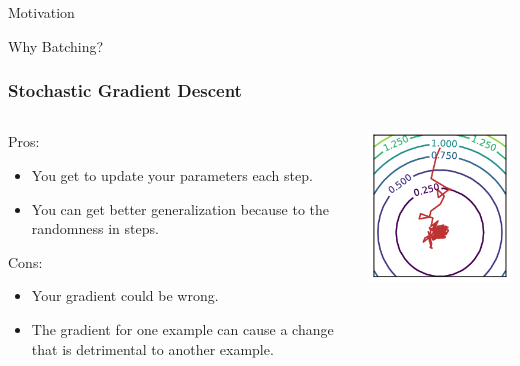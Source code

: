 \documentclass{beamer}
\begin{document}
\begin{section}{Motivation}
\begin{subsection}{Why Batching?}
        \begin{frame}
            \frametitle{Stochastic Gradient Descent}
            \begin{columns}
                \begin{column}{0.5\textwidth}
                    Pros:
                    \begin{itemize}
                        \item You get to update your parameters each step.
                        \item You can get better generalization because to the randomness in steps.
                    \end{itemize}
                    Cons:
                    \begin{itemize}
                        \item Your gradient could be wrong.
                        \item The gradient for one example can cause a change that is detrimental to another example.
                    \end{itemize}
                \end{column}
                \begin{column}{0.5\textwidth}
                    \includegraphics[width=\textwidth]{images/sgd.png}

\end{column}
\end{columns}
\end{frame}
\end{subsection}
\end{section}
\end{document}

